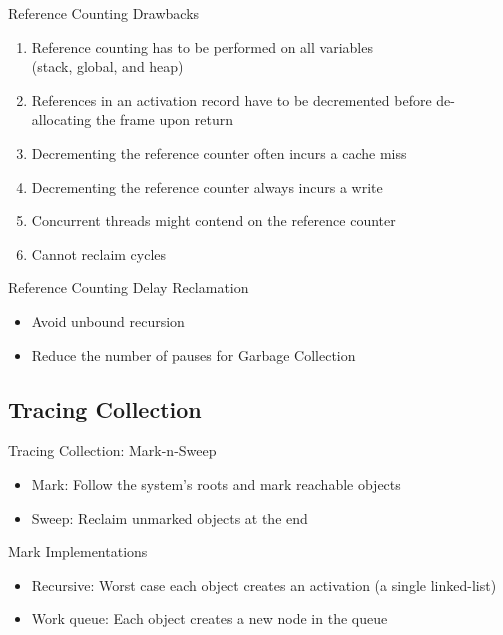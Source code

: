 \documentclass[
14pt,
aspectratio=169,
usenames,
dvipsnames,
x11names]{beamer}
\begin{document}

\begin{frame}{Reference Counting Drawbacks}
  \begin{enumerate}  \setlength{\itemsep}{\fill}
  \item Reference counting has to be \alert{performed on all variables}\\ (stack, global, and heap)
  \item References in an activation record have to be \alert{decremented before de-allocating the frame} upon return
  \item Decrementing the reference counter \alert{often incurs a cache miss}
  \item Decrementing the reference counter \alert{always incurs a write}
  \item Concurrent threads might \alert{contend on the reference counter}
  \item \alert{Cannot reclaim cycles}
  \end{enumerate}
\end{frame}

\begin{frame}{Reference Counting Delay Reclamation}
  \begin{itemize}  \setlength{\itemsep}{\fill}
  \item Avoid \alert{unbound recursion}
  \item \alert{Reduce the number of pauses} for Garbage Collection
  \end{itemize}
\end{frame}

\subsection{Tracing Collection}

\begin{frame}{Tracing Collection: Mark-n-Sweep}
  \begin{itemize}  \setlength{\itemsep}{\fill}
  \item Mark: Follow the system's roots and \alert{mark reachable objects}
  \item Sweep: \alert{Reclaim unmarked objects} at the end
  \end{itemize}
\end{frame}

\begin{frame}{Mark Implementations}
  \begin{itemize}  \setlength{\itemsep}{\fill}
  \item \alert{Recursive}: Worst case each object creates an activation (a single linked-list)
  \item \alert{Work queue}: Each object creates a new node in the queue
  \end{itemize}
\end{frame}
\end{document}
